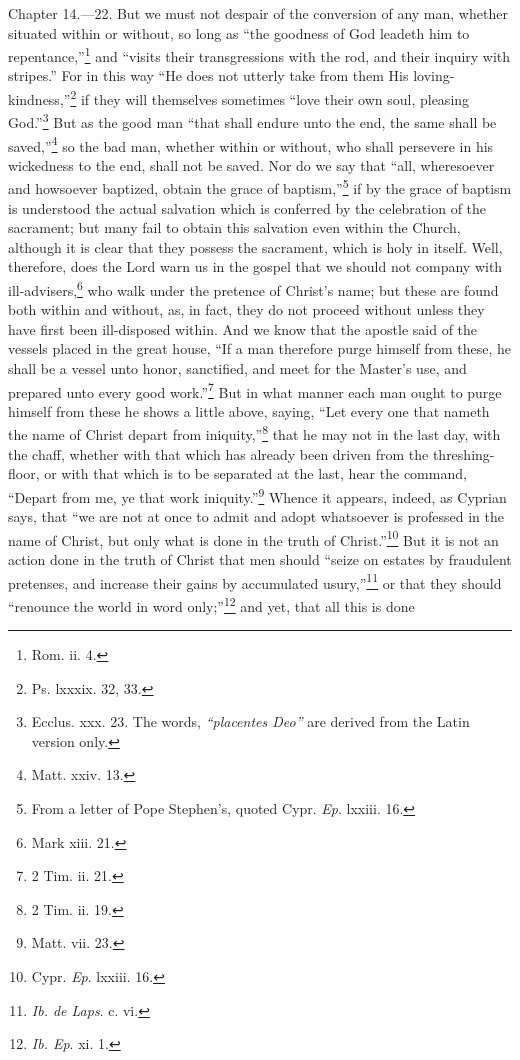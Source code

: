 Chapter 14.—22. But we must not despair of the conversion of any man, whether situated within or without, so long as ``the goodness of God leadeth him to repentance,''\footnote{\par  Rom. ii. 4.} and ``visits their transgressions with the rod, and their inquiry with stripes.'' For in this way ``He does not utterly take from them His loving-kindness,''\footnote{\par  Ps. lxxxix. 32, 33.} if they will themselves sometimes ``love their own soul, pleasing God.''\footnote{\par  Ecclus. xxx. 23. The words, \emph{``placentes Deo''} are derived from the Latin version only.} But as the good man ``that shall endure unto the end, the same shall be saved,''\footnote{\par  Matt. xxiv. 13.} so the bad man, whether within or without, who shall persevere in his wickedness to the end, shall not be saved. Nor do we say that ``all, wheresoever and howsoever baptized, obtain the grace of baptism,''\footnote{\par  From a letter of Pope Stephen’s, quoted Cypr. \emph{Ep}. lxxiii. 16.} if by the grace of baptism is understood the actual salvation which is conferred by the celebration of the sacrament; but many fail to obtain this salvation even within the Church, although it is clear that they possess the sacrament, which is holy in itself. Well, therefore, does the Lord warn us in the gospel that we should not company with ill-advisers,\footnote{\par  Mark xiii. 21.} who walk under the pretence of Christ’s name; but these are found both within and without, as, in fact, they do not proceed without unless they have first been ill-disposed within. And we know that the apostle said of the vessels placed in the great house, ``If a man therefore purge himself from these, he shall be a vessel unto honor, sanctified, and meet for the Master’s use, and prepared unto every good work.''\footnote{\par  2 Tim. ii. 21.} But in what manner each man ought to purge himself from these he shows a little above, saying, ``Let every one that nameth the name of Christ depart from iniquity,''\footnote{\par  2 Tim. ii. 19.} that he may not in the last day, with the chaff, whether with that which has already been driven from the threshing-floor, or with that which is to be separated at the last, hear the command, ``Depart from me, ye that work iniquity.''\footnote{\par  Matt. vii. 23.} Whence it appears, indeed, as Cyprian says, that ``we are not at once to admit and adopt whatsoever is professed in the name of Christ, but only what is done in the truth of Christ.''\footnote{\par  Cypr. \emph{Ep}. lxxiii. 16.} But it is not an action done in the truth of Christ that men should ``seize on estates by fraudulent pretenses, and increase their gains by accumulated usury,''\footnote{\par  \emph{Ib. de Laps}. c. vi.} or that they should ``renounce the world in word only;''\footnote{\par  \emph{Ib. Ep}. xi. 1.} and yet, that all this is done 